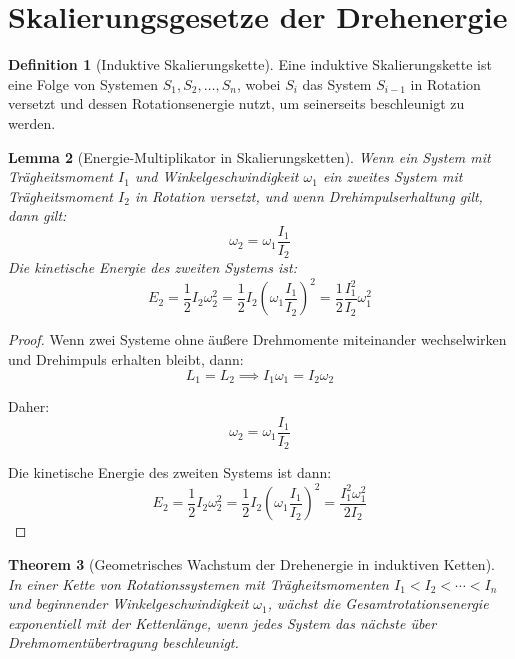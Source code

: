 \documentclass[12pt,a4paper]{report}
\theoremstyle{plain}
\newtheorem{theorem}{Theorem}[section]
\newtheorem{lemma}[theorem]{Lemma}
\theoremstyle{definition}
\newtheorem{definition}[theorem]{Definition}
\theoremstyle{remark}
\begin{document}
\section{Skalierungsgesetze der Drehenergie}

\begin{definition}[Induktive Skalierungskette]
	Eine induktive Skalierungskette ist eine Folge von Systemen $S_1, S_2, \ldots, S_n$, wobei $S_i$ das System $S_{i-1}$ in Rotation versetzt und dessen Rotationsenergie nutzt, um seinerseits beschleunigt zu werden.
\end{definition}

\begin{lemma}[Energie-Multiplikator in Skalierungsketten]
	\label{lem:multiplikator}
	Wenn ein System mit Trägheitsmoment $I_1$ und Winkelgeschwindigkeit $\omega_1$ ein zweites System mit Trägheitsmoment $I_2$ in Rotation versetzt, und wenn Drehimpulserhaltung gilt, dann gilt:
	\[
	\omega_2 = \omega_1 \frac{I_1}{I_2}
	\]
	Die kinetische Energie des zweiten Systems ist:
	\[
	E_2 = \frac{1}{2} I_2 \omega_2^2 = \frac{1}{2} I_2 \left(\omega_1 \frac{I_1}{I_2}\right)^2 = \frac{1}{2} \frac{I_1^2}{I_2} \omega_1^2
	\]
\end{lemma}

\begin{proof}
	Wenn zwei Systeme ohne äußere Drehmomente miteinander wechselwirken und Drehimpuls erhalten bleibt, dann:
	\[
	L_1 = L_2 \implies I_1 \omega_1 = I_2 \omega_2
	\]
	
	Daher:
	\[
	\omega_2 = \omega_1 \frac{I_1}{I_2}
	\]
	
	Die kinetische Energie des zweiten Systems ist dann:
	\[
	E_2 = \frac{1}{2} I_2 \omega_2^2 = \frac{1}{2} I_2 \left(\omega_1 \frac{I_1}{I_2}\right)^2 = \frac{I_1^2 \omega_1^2}{2 I_2}
	\]
\end{proof}

\begin{theorem}[Geometrisches Wachstum der Drehenergie in induktiven Ketten]
	\label{thm:geometrisch}
	In einer Kette von Rotationssystemen mit Trägheitsmomenten $I_1 < I_2 < \cdots < I_n$ und beginnender Winkelgeschwindigkeit $\omega_1$, wächst die Gesamtrotationsenergie exponentiell mit der Kettenlänge, wenn jedes System das nächste über Drehmomentübertragung beschleunigt.
\end{theorem}
\end{document}
